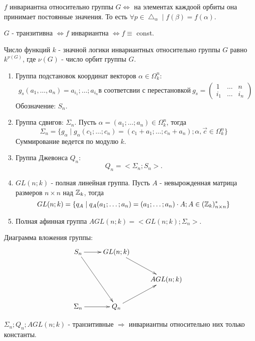 \utv $f$ инвариантна относительно группы $G \Leftrightarrow$ на элементах каждоой орбиты она принимает постоянные значения.
То есть $\forall p \in \bigtriangleup_{\alpha} \mid f(\beta) = f(\alpha)$.

\conseq $G$ - транзитивна $\Leftrightarrow f$ инвариантна $\Leftrightarrow f \equiv$ const.

\conseq Число функций $k$ - значной логики инвариантных относительно группы $G$ равно $k^{\nu(G)}$, где $\nu(G)$ - число орбит группы $G$.

\examplei
\begin{enumerate}
  \item Группа подстановок координат векторов $\alpha \in \Omega_k^n$:
    \begin{align*}
      g_s(a_1, \dots , a_n)  =  a_{i_1};\dots ;a_{i_n} \text{в соответсвии с перестановкой}\  
      g_s=
      \begin{pmatrix}
        1 & \ldots & n \\
        i_1 & \ldots & i_n
      \end{pmatrix}
  \end{align*}
  Обозначение: $S_n$.

  \item Группа сдвигов: $\Sigma_n $. Пусть $\alpha = (a_1;\dots;a_n) \in \Omega_k^n $, тогда
    $$
      \Sigma_n = \{g_\alpha \mid g_\alpha(c_1; \ldots; c_n)=(c_1+a_1; \ldots; c_n+a_n); \alpha, \vec{c} \in \Omega_k^n\}
    $$
  Суммирование ведется по модулю $k$.

  \item Группа Джевонса $Q_n$:
    $$
      Q_n = <\Sigma_n;S_n>.
    $$
  \item $GL(n;k)$ - полная линейная группа. Пусть $A$ - невырожденная матрица размеров $n \times n $ над $\mathbb{Z}_k$, тогда
  $$
    GL(n;k)=\{q_A \mid q_A(a_1;\ldots;a_n) = (a_1;\ldots;a_n) \cdot A; A \in (\mathbb{Z}_k)_{n \times n}^* \}
  $$

  \item Полная афинная группа $AGL(n;k)=<GL(n;k);\Sigma_n>$.
\end{enumerate}

Диаграмма вложения группы:
\begin{align*}
  \xymatrix{
    S_n      \ar[r] \ar[rdd]  & GL(n; k) \ar[rd] \\
    & & AGL(n;k) \\
    \Sigma_n \ar[r]  & Q_n \ar[ru]
  }
\end{align*}

$\Sigma_n; Q_n; AGL(n;k) $ - транзитивные $\Rightarrow$ инвариантны относительно них только константы.

